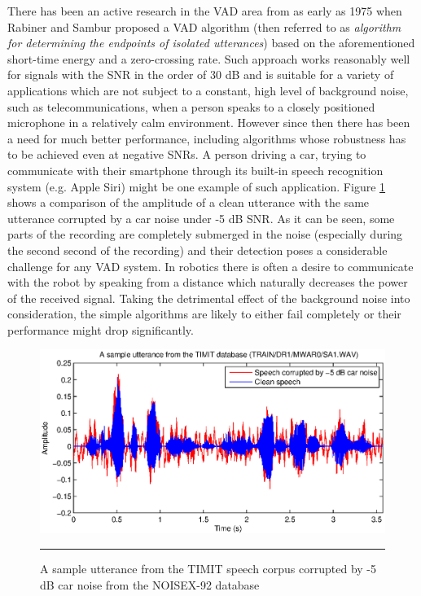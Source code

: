 There has been an active research in the VAD area from as early as 1975 when Rabiner and Sambur \cite{RabinerSambur} proposed a VAD algorithm (then referred to as \emph{algorithm for determining the endpoints of isolated utterances}) based on the aforementioned short-time energy and a zero-crossing rate. Such approach works reasonably well for signals with the SNR in the order of 30 dB and is suitable for a variety of applications which are not subject to a constant, high level of background noise, such as telecommunications, when a person speaks to a closely positioned microphone in a relatively calm environment. However since then there has been a need for much better performance, including algorithms whose robustness has to be achieved even at negative SNRs. A person driving a car, trying to communicate with their smartphone through its built-in speech recognition system (e.g. Apple Siri) might be one example of such application. Figure \ref{fig:corruptedSpeech} shows a comparison of the amplitude of a clean utterance with the same utterance corrupted by a car noise under -5 dB SNR. As it can be seen, some parts of the recording are completely submerged in the noise (especially during the second second of the recording) and their detection poses a considerable challenge for any VAD system. In robotics there is often a desire to communicate with the robot by speaking from a distance which naturally decreases the power of the received signal. Taking the detrimental effect of the background noise into consideration, the simple algorithms are likely to either fail completely or their performance might drop significantly.

\begin{figure}[htbp]
	\centering
		\includegraphics[width=0.9\columnwidth]{Figures/Chapter1/corruptedSpeech.eps}
		\rule{37em}{0.5pt}
	\caption[A sample utterance corrupted by -5 dB car noise]{A sample utterance from the TIMIT \cite{TIMIT} speech corpus corrupted by -5 dB car noise from the NOISEX-92 \cite{NOISEX} database}
	\label{fig:corruptedSpeech}
\end{figure}

